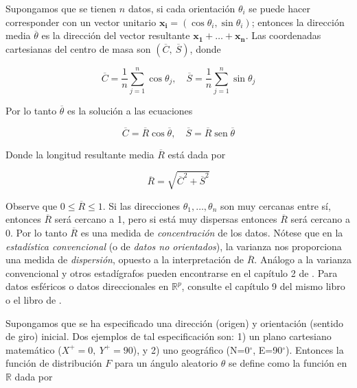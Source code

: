 Supongamos que se tienen \(n\) datos, si cada orientaci\'on \(\theta_{i}\) se puede hacer corresponder con un vector unitario \(\mathbf{x}_{\mathbf{i}} = ( \cos\theta_{i},\sin\theta_{i} )\); entonces la direcci\'on media \(\overline{\theta}\) es la direcci\'on del vector resultante \(\mathbf{x}_{\mathbf{1}} + \ldots + \mathbf{x}_{\mathbf{n}}\). Las coordenadas cartesianas del centro de masa son \(( \overline{C},\ \overline{S} )\), donde

\begin{equation}
\overline{C} = \frac{1}{n}\sum_{j = 1}^{n}{\cos\theta_{j}},
\quad
\overline{S} = \frac{1}{n}\sum_{j = 1}^{n}{\sin\theta_{j}}
\end{equation}

Por lo tanto \(\overline{\theta}\) es la soluci\'on a las ecuaciones

\begin{equation}
\overline{C} = \overline{R}\cos\overline{\theta},
\quad
\overline{S} = \overline{R}\operatorname{sen}\overline{\theta}\end{equation}

Donde la longitud resultante media \(\overline{R}\) est\'a dada por

\begin{equation}
\overline{R} = \sqrt{{\overline{C}}^{2} + {\overline{S}}^{2}} \end{equation}

Observe que \(0 \leq \overline{R} \leq 1\). Si las direcciones \(\theta_{1},\ldots,\theta_{n}\) son muy cercanas entre s\'i, entonces \(\overline{R}\) ser\'a cercano a 1, pero si est\'a muy dispersas entonces \(\overline{R}\) ser\'a cercano a 0. Por lo tanto \(\overline{R}\) es una medida de \emph{concentraci\'on} de los datos. N\'otese que en la \emph{estad\'istica convencional} (o de \emph{datos no orientados}), la varianza nos proporciona una medida de \emph{dispersi\'on}, opuesto a la interpretaci\'on de \(\overline{R}.\) An\'alogo a la varianza convencional y otros estad\'igrafos pueden encontrarse en el cap\'itulo 2 de \cite{mardia_directional_2000}. Para datos esf\'ericos o datos direccionales en \(\mathbb{R}^{p}\), consulte el cap\'itulo 9 del mismo libro o el libro de \cite{fisher_statistical_1993}.

Supongamos que se ha especificado una direcci\'on (origen) y orientaci\'on (sentido de giro) inicial. Dos ejemplos de tal especificaci\'on son: 1) un plano cartesiano matem\'atico (\(X^{+} = 0,\ Y^{+} = 90\)), y 2) uno geogr\'afico (N=0$^\circ$, E=90$^\circ$). Entonces la funci\'on de distribuci\'on \(F\) para un \'angulo aleatorio \(\theta\) se define como la funci\'on en
\(\mathbb{R}\) dada por

